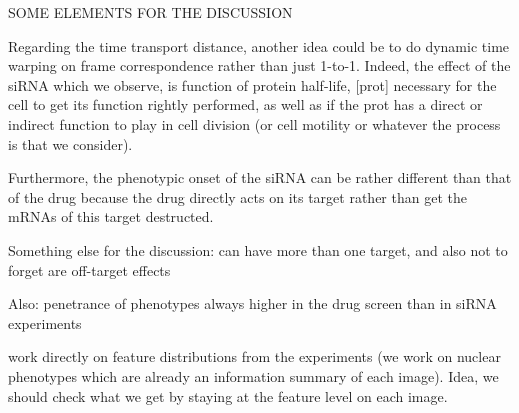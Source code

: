 SOME ELEMENTS FOR THE DISCUSSION

Regarding the time transport distance, another idea could be to do dynamic time warping on frame correspondence rather than just 1-to-1. Indeed, the effect of the siRNA which we observe, is function of protein half-life, [prot] necessary for the cell to get its function rightly performed, as well as  if the prot has a direct or indirect function to play in cell division (or cell motility or whatever the process is that we consider).

Furthermore, the phenotypic onset of the siRNA can be rather different than that of the drug because the drug directly acts on its target rather than get the mRNAs of this target destructed.

Something else for the discussion: can have more than one target, and also not to forget are off-target effects

Also: penetrance of phenotypes always higher in the drug screen than in siRNA experiments

\cite{pmid18066055} work directly on feature distributions from the experiments (we work on nuclear phenotypes which are already an information summary of each image). Idea, we should check what we get by staying at the feature level on each image.
